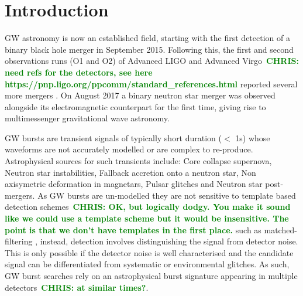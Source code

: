 \documentclass[12pt]{iopart}
\newcommand{\chris}[1]{\textbf{\textcolor{green}{CHRIS: #1}}}
\begin{document}
\section{Introduction}

%
\ac{GW} astronomy is now an established field, starting with the first
detection of a binary black hole merger \cite{Abbott2016} in September 2015.
Following this, the first and second observations runs (O1 and O2) of Advanced
LIGO and Advanced Virgo~\chris{need refs for the detectors, see here
https://pnp.ligo.org/ppcomm/standard\_references.html} reported several more
mergers \cite{Abbott2016a, Abbott2017, Abbott2017a, Abbott2017b}. On August
2017 a binary neutron star merger was observed alongside its electromagnetic
counterpart for the first time, giving rise to multimessenger gravitational
wave astronomy. 

%
GW bursts are transient signals of typically short duration ($<$ 1s) whose
waveforms are not accurately modelled or are complex to re-produce.
Astrophysical sources for such transients include: Core collapse supernova,
Neutron star instabilities, Fallback accretion onto a neutron star, Non
axisymetric deformation in magnetars, Pulsar glitches and Neutron star
post-mergers.  As \ac{GW} bursts are un-modelled they are not sensitive to
template based detection schemes~\chris{OK, but logically dodgy. You make it
sound like we could use a template scheme but it would be insensitive. The
point is that we don't have templates in the first place.} such as
matched-filtering \cite{Owen1998}, instead, detection involves distinguishing
the signal from detector noise. This is only possible if the detector noise is
well characterised and the candidate signal can be differentiated from
systematic or environmental glitches. As such, \ac{GW} burst searches rely on
an astrophysical burst signature appearing in multiple detectors~\chris{at
similar times?}.  
\end{document}

